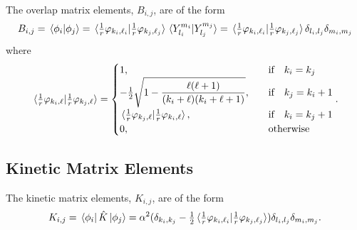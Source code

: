 \documentclass[draft]{article}
\begin{document}
The overlap matrix elements, $B_{i, j}$, are of the form
\begin{equation}
  \label{eq:me-overlap}
  B_{i, j}
  =
  \bra*{\phi_{i}}
  \ket*{\phi_{j}}
  =
  \bra*{\tfrac{1}{r}\varphi_{k_{i}, \ell_{i}}}
  \ket*{\tfrac{1}{r}\varphi_{k_{j}, \ell_{j}}}
  \bra*{Y_{l_{i}}^{m_{i}}}
  \ket*{Y_{l_{j}}^{m_{j}}}
  =
  \bra*{\tfrac{1}{r}\varphi_{k_{i}, \ell_{i}}}
  \ket*{\tfrac{1}{r}\varphi_{k_{j}, \ell_{j}}}
  \delta_{l_{i}, l_{j}}
  \delta_{m_{i}, m_{j}}
\end{equation}
where
\begin{equation}
  \label{eq:me-overlap-radial}
  \bra*{\tfrac{1}{r}\varphi_{k_{i}, \ell}}
  \ket*{\tfrac{1}{r}\varphi_{k_{j}, \ell}}
  =
  \begin{cases}
    1
    ,
    &
    \qq{if} k_{i} = k_{j}
    \\
    -
    \tfrac{1}{2}
    \sqrt
    {
      1
      -
      \dfrac
      {
        \ell
        \lr{\ell + 1}
      }
      {
        \lr{k_{i} + \ell}
        \lr{k_{i} + \ell + 1}
      }
    }
    ,
    &
    \qq{if}
    k_{j} = k_{i} + 1
    \\
    \bra*{\tfrac{1}{r}\varphi_{k_{j}, \ell}}
    \ket*{\tfrac{1}{r}\varphi_{k_{i}, \ell}}
    ,
    &
    \qq{if}
    k_{i} = k_{j} + 1
    \\
    0
    ,
    &
    \qq{otherwise}
    \\
  \end{cases}
  .
\end{equation}

\subsection*{Kinetic Matrix Elements}

The kinetic matrix elements, $K_{i, j}$, are of the form
\begin{equation}
  \label{eq:me-kinetic}
  K_{i, j}
  =
  \bra*{\phi_{i}}
  \hat{K}
  \ket*{\phi_{j}}
  =
  \alpha^{2}
  (
    \delta_{k_{i}, k_{j}}
    -
    \tfrac{1}{2}
    \bra*{\tfrac{1}{r}\varphi_{k_{i}, \ell_{i}}}
    \ket*{\tfrac{1}{r}\varphi_{k_{j}, \ell_{j}}}
  )
  \delta_{l_{i}, l_{j}}
  \delta_{m_{i}, m_{j}}
  .
\end{equation}
\end{document}
